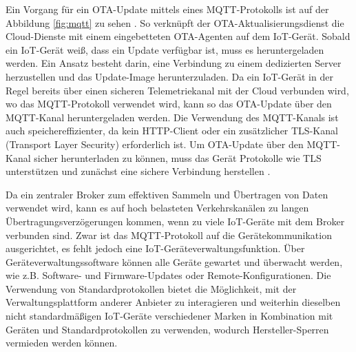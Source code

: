 Ein Vorgang für ein OTA-Update mittels eines MQTT-Protokolls ist auf der Abbildung \ref{fig:mqtt} zu sehen \cite[p.5]{website:mqtt}. So verknüpft der OTA-Aktualisierungsdienst die Cloud-Dienste mit einem eingebetteten OTA-Agenten auf dem IoT-Gerät. Sobald ein IoT-Gerät weiß, dass ein Update verfügbar ist, muss es heruntergeladen werden. Ein Ansatz besteht darin, eine Verbindung zu einem dedizierten Server herzustellen und das Update-Image herunterzuladen. Da ein IoT-Gerät in der Regel bereits über einen sicheren Telemetriekanal mit der Cloud verbunden wird, wo das MQTT-Protokoll verwendet wird, kann so das OTA-Update über den MQTT-Kanal heruntergeladen werden. Die Verwendung des MQTT-Kanals ist auch speichereffizienter, da kein HTTP-Client oder ein zusätzlicher TLS-Kanal (Transport Layer Security) erforderlich ist. Um OTA-Update über den MQTT-Kanal sicher herunterladen zu können, muss das Gerät Protokolle wie TLS unterstützen und zunächst eine sichere Verbindung herstellen \cite[p.3]{website:mqtt}.

Da ein zentraler Broker zum effektiven Sammeln und Übertragen von Daten verwendet wird, kann es auf hoch belasteten Verkehrskanälen zu langen Übertragungsverzögerungen kommen, wenn zu viele IoT-Geräte mit dem Broker verbunden sind. Zwar ist das MQTT-Protokoll auf die Gerätekommunikation ausgerichtet, es fehlt jedoch eine IoT-Geräteverwaltungsfunktion. Über Geräteverwaltungssoftware können alle Geräte gewartet und überwacht werden, wie z.B. Software- und Firmware-Updates oder Remote-Konfigurationen. Die Verwendung von Standardprotokollen bietet die Möglichkeit, mit der Verwaltungsplattform anderer Anbieter zu interagieren und weiterhin dieselben nicht standardmäßigen IoT-Geräte verschiedener Marken in Kombination mit Geräten und Standardprotokollen zu verwenden, wodurch Hersteller-Sperren vermieden werden können.



